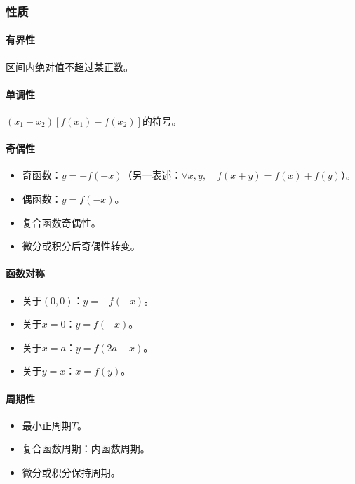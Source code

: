 \documentclass[
12pt, %
a4paper, 
oneside, %
]{scrartcl}
\begin{document}
\subsubsection[性质]{性质}
\noindent
\begin{minipage}{0.5\textwidth}
\paragraph{有界性}
区间内绝对值不超过某正数。
\end{minipage}
\begin{minipage}{0.5\textwidth}
\paragraph{单调性}
$ (x_1 - x_2)[f(x_1) - f(x_2)] $的符号。
\end{minipage}

\noindent
\begin{minipage}{0.5\textwidth}
\paragraph{奇偶性}
\begin{itemize}
\item 奇函数：$ y = -f(-x) $（另一表述：$ \forall x, y, \quad f(x + y) = f(x) + f(y) $）。
\item 偶函数：$ y = f(-x) $。
\item 复合函数奇偶性。
\item 微分或积分后奇偶性转变。
\end{itemize}
\end{minipage}
\begin{minipage}{0.5\textwidth}
\paragraph{函数对称}
\begin{itemize}
\item 关于$ (0, 0) $：$ y = -f(-x) $。
\item 关于$ x = 0 $：$ y = f(-x) $。
\item 关于$ x = a $：$ y = f(2a - x) $。
\item 关于$ y = x $：$ x = f(y) $。
\end{itemize}    
\end{minipage}
\paragraph{周期性}
\begin{itemize}
\item 最小正周期$ T $。
\item 复合函数周期：内函数周期。
\item 微分或积分保持周期。
\end{itemize}
\end{document}
